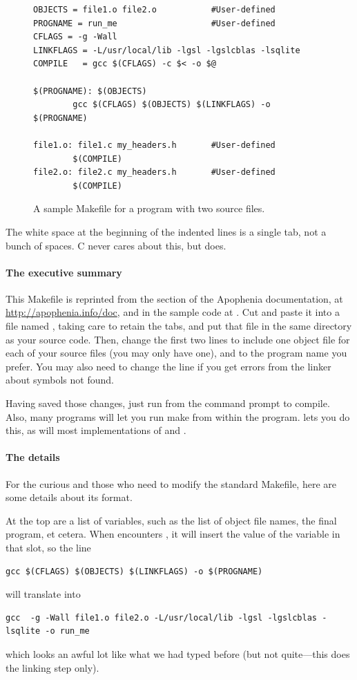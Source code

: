 \begin{figure}
\begin{verbatim}
OBJECTS = file1.o file2.o           #User-defined
PROGNAME = run_me                   #User-defined
CFLAGS = -g -Wall
LINKFLAGS = -L/usr/local/lib -lgsl -lgslcblas -lsqlite
COMPILE   = gcc $(CFLAGS) -c $< -o $@

$(PROGNAME): $(OBJECTS)
        gcc $(CFLAGS) $(OBJECTS) $(LINKFLAGS) -o $(PROGNAME)

file1.o: file1.c my_headers.h       #User-defined
        $(COMPILE)
file2.o: file2.c my_headers.h       #User-defined
        $(COMPILE)
\end{verbatim}
\caption{A sample Makefile for a program with two source files.}
\label{makefig}
\end{figure}

The white space at the beginning of the indented lines is a single tab,
not a bunch of spaces.  C never cares about this, but 
does.

\paragraph{The executive summary} This Makefile is reprinted from the 
section of the Apophenia documentation, at
\url{http://apophenia.info/doc}, and in the sample code at 
\samplecodelocation. Cut and paste it into a file named
, taking care to retain the tabs, and put that file in
the same directory as your source code. Then, change the first two lines
to include one object file for each of your source files (you may only
have one), and
to the program name you prefer.  You may also need to change the
 line if you get errors from the linker about symbols
not found.

Having saved those changes, just run
 from the command prompt to compile.
Also, many programs will let you run
make from within the program.  lets you do this,
as will most implementations of  and .


\paragraph{The details} For the curious and those who need to modify
the standard Makefile, here are some details about its format.

At the top are a list of variables, such as the list of object file names, the final program, et cetera.
When  encounters , it will insert the value of the variable  in that
slot, so the line 
\begin{lstlisting}
gcc $(CFLAGS) $(OBJECTS) $(LINKFLAGS) -o $(PROGNAME)
\end{lstlisting}
will translate into
\begin{lstlisting}
gcc  -g -Wall file1.o file2.o -L/usr/local/lib -lgsl -lgslcblas -lsqlite -o run_me
\end{lstlisting}
which looks an awful lot like what we had typed before (but not quite---this does the linking step only).

